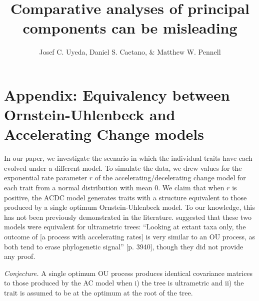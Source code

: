 \documentclass[12pt,twoside]{article}
\title{Comparative analyses of principal components can be misleading}
\author{Josef C. Uyeda, Daniel S. Caetano, \& Matthew W. Pennell}
\date{}
\begin{document}
\maketitle

\section{Appendix: Equivalency between Ornstein-Uhlenbeck and Accelerating Change models}

In our paper, we investigate the scenario in which the individual traits have each evolved under a different model. To simulate the data, we drew values for the exponential rate parameter $r$ of the accelerating/decelerating change \citep[ACDC;][]{Blomberg2003} model for each trait from a normal distribution with mean 0. We claim that when $r$ is positive, the ACDC model generates traits with a structure equivalent to those produced by a single optimum Ornstein-Uhlenbeck \citep[OU;][]{Hansen1997} model. To our knowledge, this has not been previously demonstrated in the literature. \citet{SlaterFossil} suggested that these two models were equivalent for ultrametric trees: ``Looking at extant taxa only, the outcome of [a process with accelerating rates] is very similar to an OU process, as both tend to erase phylogenetic signal'' [p. 3940], though they did not provide any proof.\bigskip

\noindent \emph{Conjecture.} A single optimum OU process produces identical covariance matrices to those produced by the AC model when i) the tree is ultrametric and ii) the trait is assumed to be at the optimum at the root of the tree.
\end{document}
